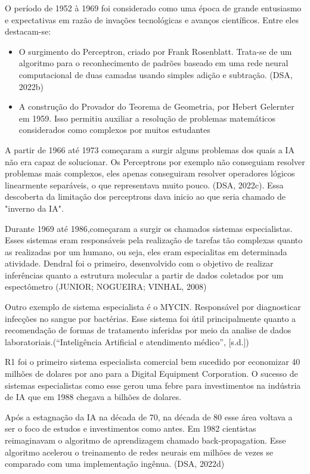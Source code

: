 \documentclass[a4paper,12pt]{article}
\begin{document}
O período de 1952 à 1969 foi considerado como uma época de grande entusiasmo e expectativas em razão de invações tecnológicas e avanços científicos. Entre eles destacam-se:

\begin{itemize}
    \item O surgimento do Perceptron, criado por Frank Rosenblatt. Trata-se de um algoritmo para o reconhecimento de padrões baseado em uma rede neural computacional de duas camadas usando simples adição e subtração. (DSA, 2022b)
    
    \item A construção do Provador do Teorema de Geometria, por Hebert Gelernter em 1959. Isso permitiu auxiliar a resolução de problemas matemáticos considerados como complexos por muitos estudantes 

\end{itemize}

A partir de 1966 até 1973 começaram a surgir alguns problemas dos quais a IA não era capaz de solucionar. Os Perceptrons por exemplo não conseguiam resolver problemas mais complexos, eles apenas conseguiram resolver operadores lógicos linearmente separáveis, o que representava muito pouco. (DSA, 2022c). Essa descoberta da limitação dos perceptrons dava inicio ao que seria chamado de "inverno da IA". 

Durante 1969 até 1986,começaram a surgir os chamados sistemas especialistas. Esses sistemas eram responsáveis pela realização de tarefas tão complexas quanto as realizadas por um humano, ou seja, eles eram especialitas em determinada atividade. Dendral foi o primeiro, desenvolvido com o objetivo de realizar inferências quanto a estrutura molecular a partir de dados coletados por um espectômetro (JUNIOR; NOGUEIRA; VINHAL, 2008)

Outro exemplo de sistema especialista é o MYCIN. Responsável por diagnosticar infecções no sangue por bactérias. Esse sistema foi útil principalmente quanto a recomendação de formas de tratamento inferidas por meio da analise de dados laboratoriais.(“Inteligência Artificial e atendimento médico”, [s.d.])

R1 foi o primeiro sistema especialista comercial bem sucedido por economizar 40 milhões de dolares por ano para a Digital Equipment Corporation. O sucesso de sistemas especialistas como esse gerou uma febre para investimentos na indústria de IA que em 1988 chegava a bilhões de dolares.

Após a estagnação da IA na década de 70, na década de 80 esse área voltava a ser o foco de estudos e investimentos como antes.
Em 1982 cientistas reimaginavam o algoritmo de aprendizagem chamado back-propagation. Esse algoritmo acelerou o treinamento de redes neurais em milhões de vezes se comparado com uma implementação ingênua. (DSA, 2022d) 
\end{document}
